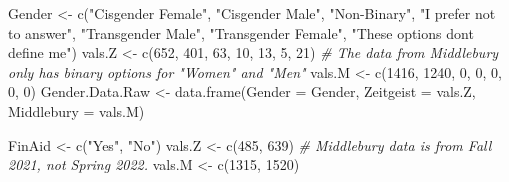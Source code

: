 \documentclass[
]{article}
\newenvironment{Shaded}{\begin{snugshade}}{\end{snugshade}}
\newcommand{\AttributeTok}[1]{\textcolor[rgb]{0.77,0.63,0.00}{#1}}
\newcommand{\CommentTok}[1]{\textcolor[rgb]{0.56,0.35,0.01}{\textit{#1}}}
\newcommand{\DecValTok}[1]{\textcolor[rgb]{0.00,0.00,0.81}{#1}}
\newcommand{\FunctionTok}[1]{\textcolor[rgb]{0.00,0.00,0.00}{#1}}
\newcommand{\NormalTok}[1]{#1}
\newcommand{\OtherTok}[1]{\textcolor[rgb]{0.56,0.35,0.01}{#1}}
\newcommand{\StringTok}[1]{\textcolor[rgb]{0.31,0.60,0.02}{#1}}
\begin{document}
\begin{Shaded}
\begin{Highlighting}[]
\NormalTok{Gender }\OtherTok{\textless{}{-}} \FunctionTok{c}\NormalTok{(}\StringTok{"Cisgender Female"}\NormalTok{, }\StringTok{"Cisgender Male"}\NormalTok{, }\StringTok{"Non{-}Binary"}\NormalTok{, }
            \StringTok{"I prefer not to answer"}\NormalTok{, }\StringTok{"Transgender Male"}\NormalTok{, }\StringTok{"Transgender Female"}\NormalTok{,}
            \StringTok{"These options don\textquotesingle{}t define me"}\NormalTok{)}
\NormalTok{vals.Z }\OtherTok{\textless{}{-}} \FunctionTok{c}\NormalTok{(}\DecValTok{652}\NormalTok{, }\DecValTok{401}\NormalTok{, }\DecValTok{63}\NormalTok{, }\DecValTok{10}\NormalTok{, }\DecValTok{13}\NormalTok{, }\DecValTok{5}\NormalTok{, }\DecValTok{21}\NormalTok{)}
\CommentTok{\# The data from Middlebury only has binary options for "Women" and "Men"}
\NormalTok{vals.M }\OtherTok{\textless{}{-}} \FunctionTok{c}\NormalTok{(}\DecValTok{1416}\NormalTok{, }\DecValTok{1240}\NormalTok{, }\DecValTok{0}\NormalTok{, }\DecValTok{0}\NormalTok{, }\DecValTok{0}\NormalTok{, }\DecValTok{0}\NormalTok{, }\DecValTok{0}\NormalTok{)}
\NormalTok{Gender.Data.Raw }\OtherTok{\textless{}{-}} \FunctionTok{data.frame}\NormalTok{(}\AttributeTok{Gender =}\NormalTok{ Gender,}
                          \AttributeTok{Zeitgeist =}\NormalTok{ vals.Z,}
                          \AttributeTok{Middlebury =}\NormalTok{ vals.M)}

\NormalTok{FinAid }\OtherTok{\textless{}{-}} \FunctionTok{c}\NormalTok{(}\StringTok{"Yes"}\NormalTok{, }\StringTok{"No"}\NormalTok{)}
\NormalTok{vals.Z }\OtherTok{\textless{}{-}} \FunctionTok{c}\NormalTok{(}\DecValTok{485}\NormalTok{, }\DecValTok{639}\NormalTok{)}
\CommentTok{\# Middlebury data is from Fall 2021, not Spring 2022.}
\NormalTok{vals.M }\OtherTok{\textless{}{-}} \FunctionTok{c}\NormalTok{(}\DecValTok{1315}\NormalTok{, }\DecValTok{1520}\NormalTok{)}


\end{Highlighting}
\end{Shaded}
\end{document}
